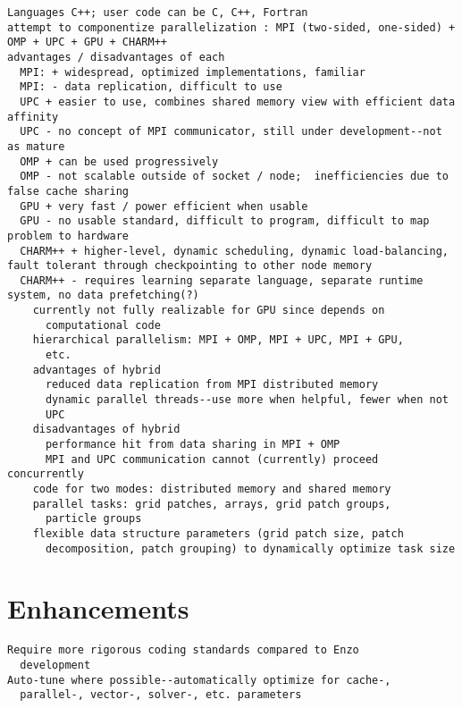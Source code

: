 \documentclass[14pt,letter]{article}
\begin{document}
\begin{verbatim}
Languages C++; user code can be C, C++, Fortran
attempt to componentize parallelization : MPI (two-sided, one-sided) + OMP + UPC + GPU + CHARM++
advantages / disadvantages of each
  MPI: + widespread, optimized implementations, familiar
  MPI: - data replication, difficult to use
  UPC + easier to use, combines shared memory view with efficient data affinity
  UPC - no concept of MPI communicator, still under development--not as mature
  OMP + can be used progressively
  OMP - not scalable outside of socket / node;  inefficiencies due to false cache sharing
  GPU + very fast / power efficient when usable
  GPU - no usable standard, difficult to program, difficult to map problem to hardware
  CHARM++ + higher-level, dynamic scheduling, dynamic load-balancing, fault tolerant through checkpointing to other node memory
  CHARM++ - requires learning separate language, separate runtime system, no data prefetching(?)
    currently not fully realizable for GPU since depends on
      computational code
    hierarchical parallelism: MPI + OMP, MPI + UPC, MPI + GPU,
      etc.
    advantages of hybrid
      reduced data replication from MPI distributed memory
      dynamic parallel threads--use more when helpful, fewer when not
      UPC
    disadvantages of hybrid
      performance hit from data sharing in MPI + OMP
      MPI and UPC communication cannot (currently) proceed concurrently
    code for two modes: distributed memory and shared memory
    parallel tasks: grid patches, arrays, grid patch groups,
      particle groups
    flexible data structure parameters (grid patch size, patch
      decomposition, patch grouping) to dynamically optimize task size
\end{verbatim}
    
\section{Enhancements}

\begin{verbatim}
Require more rigorous coding standards compared to Enzo
  development
Auto-tune where possible--automatically optimize for cache-,
  parallel-, vector-, solver-, etc. parameters
\end{verbatim}

\end{document}
